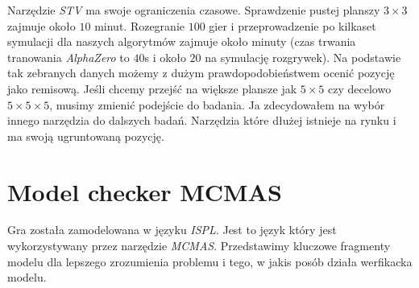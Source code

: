     Narzędzie \textit{STV} ma swoje ograniczenia czasowe. Sprawdzenie pustej 
    planszy $3 \times 3$ zajmuje około $10 $ minut. Rozegranie $100$ gier 
    i przeprowadzenie po kilkaset symulacji dla naszych algorytmów zajmuje 
    około minuty (czas trwania tranowania \textit{AlphaZero} to $40$s i około 
    $20$ na symulację rozgrywek). Na podstawie tak zebranych danych możemy 
    z dużym prawdopodobieństwem ocenić pozycję jako remisową. Jeśli chcemy 
    przejść na większe plansze jak $5 \times 5$ czy decelowo $5 \times 5 \times 5$,
    musimy zmienić podejście do badania. Ja zdecydowałem na wybór innego narzędzia 
    do dalszych badań. Narzędzia które dłużej istnieje na rynku i ma swoją 
    ugruntowaną pozycję.





\section{Model checker MCMAS}
Gra została zamodelowana w języku \textit{ISPL}. Jest to język który jest wykorzystywany przez narzędzie \textit{MCMAS}.
Przedstawimy kluczowe fragmenty modelu dla lepszego zrozumienia problemu i tego, w jakis posób działa werfikacka modelu.

    
